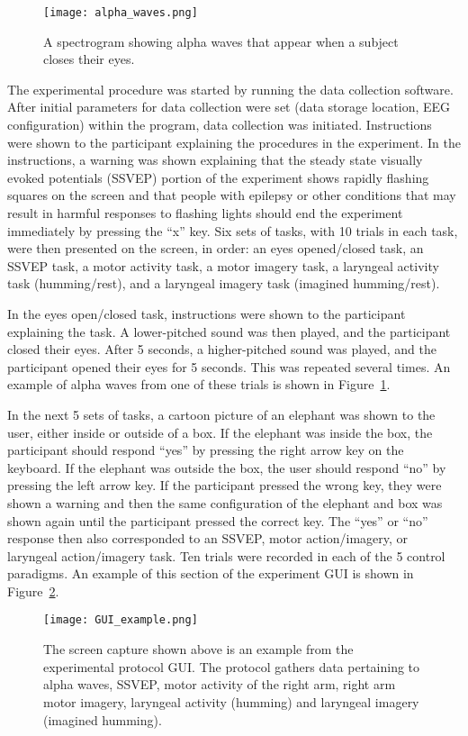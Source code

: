 \documentclass{article}
\begin{document}
\begin{figure}
    \centering
    \texttt{[image: alpha\_waves.png]}
    \caption{A spectrogram showing alpha waves that appear when a subject closes their eyes.}
    \label{alpha_waves}
\end{figure}

The experimental procedure was started by running the data collection software. After initial parameters for data collection were set (data storage location, EEG configuration) within the program, data collection was initiated. Instructions were shown to the participant explaining the procedures in the experiment. In the instructions, a warning was shown explaining that the steady state visually evoked potentials (SSVEP) portion of the experiment shows rapidly flashing squares on the screen and that people with epilepsy or other conditions that may result in harmful responses to flashing lights should end the experiment immediately by pressing the “x” key. Six sets of tasks, with 10 trials in each task, were then presented on the screen, in order: an eyes opened/closed task, an SSVEP task, a motor activity task, a motor imagery task, a laryngeal activity task (humming/rest), and a laryngeal imagery task (imagined humming/rest).

In the eyes open/closed task, instructions were shown to the participant explaining the task. A lower-pitched sound was then played, and the participant closed their eyes. After 5 seconds, a higher-pitched sound was played, and the participant opened their eyes for 5 seconds. This was repeated several times. An example of alpha waves from one of these trials is shown in Figure~\ref{alpha_waves}.

In the next 5 sets of tasks, a cartoon picture of an elephant was shown to the user, either inside or outside of a box. If the elephant was inside the box, the participant should respond “yes” by pressing the right arrow key on the keyboard. If the elephant was outside the box, the user should respond “no” by pressing the left arrow key. If the participant pressed the wrong key, they were shown a warning and then the same configuration of the elephant and box was shown again until the participant pressed the correct key. The “yes” or “no” response then also corresponded to an SSVEP, motor action/imagery, or laryngeal action/imagery task. Ten trials were recorded in each of the 5 control paradigms. An example of this section of the experiment GUI is shown in Figure~\ref{gui}.

\begin{figure}
    \centering
    \texttt{[image: GUI\_example.png]}
    \caption{The screen capture shown above is an example from the experimental protocol GUI. The protocol gathers data pertaining to alpha waves, SSVEP, motor activity of the right arm, right arm motor imagery, laryngeal activity (humming) and laryngeal imagery (imagined humming).}
    \label{gui}
\end{figure}
\end{document}
